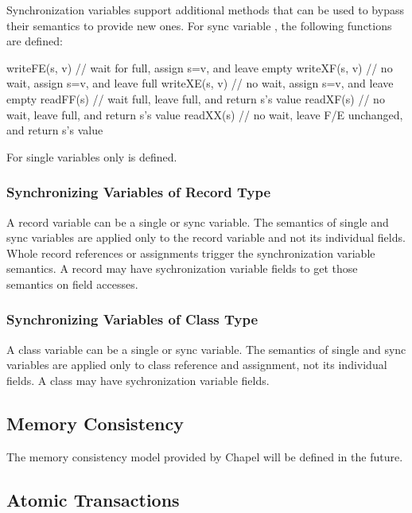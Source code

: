 Synchronization variables support additional methods that
can be used to bypass their semantics to provide new ones. For
sync variable , the following functions are defined:
\begin{chapel}
writeFE(s, v) // wait for full, assign s=v, and leave empty
writeXF(s, v) // no wait, assign s=v, and leave full
writeXE(s, v) // no wait, assign s=v, and leave empty
readFF(s)     // wait full, leave full, and return s's value
readXF(s)     // no wait, leave full, and return s's value
readXX(s)     // no wait, leave F/E unchanged, and return s's value
\end{chapel}

For single variables  only  is defined.


\subsubsection{Synchronizing Variables of Record Type}
\label{Synchronization_Variables_of_Record_Type}

A record variable can be a single or sync variable. The semantics of
single and sync variables are applied only to the record variable and
not its individual fields. Whole record references or assignments
trigger the synchronization variable semantics.  A record may have
sychronization variable fields to get those semantics on field
accesses.

\subsubsection{Synchronizing Variables of Class Type}
\label{Synchronization_Variables_of_Class_Type}

A class variable can be a single or sync variable. The semantics of
single and sync variables are applied only to class reference and
assignment, not its individual fields. A class may have sychronization
variable fields.


\subsection{Memory Consistency}
\label{Memory_Consistency}
The memory consistency model provided by Chapel will be defined in the future.

\subsection{Atomic Transactions}
\label{Atomic_Transactions}

